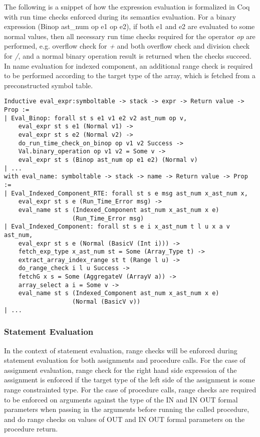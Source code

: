 The following is a snippet of how the expression evaluation is formalized in Coq
with run time checks enforced during its semantics evaluation. For a binary
expression (Binop ast\_num op e1 op e2), if both e1 and e2 are evaluated to some
normal values, then all necessary run time checks required for the operator
\textit{op} are performed, e.g. overflow check for \textit{+} and both overflow
check and division check for \textit{/}, and a normal binary operation result is
returned when the checks succeed. In name evaluation for indexed component, an
additional range check is required to be performed according to the target type
of the array, which is fetched from a preconstructed symbol table.

\begin{lstlisting}[escapechar=\#, language=coq, basicstyle=\small]
Inductive eval_expr:symboltable -> stack -> expr -> Return value -> Prop :=
| Eval_Binop: forall st s e1 v1 e2 v2 ast_num op v,
    eval_expr st s e1 (Normal v1) ->
    eval_expr st s e2 (Normal v2) ->
    do_run_time_check_on_binop op v1 v2 Success ->
    Val.binary_operation op v1 v2 = Some v ->
    eval_expr st s (Binop ast_num op e1 e2) (Normal v)
| ...
with eval_name: symboltable -> stack -> name -> Return value -> Prop :=
| Eval_Indexed_Component_RTE: forall st s e msg ast_num x_ast_num x,
    eval_expr st s e (Run_Time_Error msg) ->
    eval_name st s (Indexed_Component ast_num x_ast_num x e) 
                   (Run_Time_Error msg)
| Eval_Indexed_Component: forall st s e i x_ast_num t l u x a v ast_num, 
    eval_expr st s e (Normal (BasicV (Int i))) ->
    fetch_exp_type x_ast_num st = Some (Array_Type t) ->
    extract_array_index_range st t (Range l u) ->
    do_range_check i l u Success ->
    fetchG x s = Some (AggregateV (ArrayV a)) ->
    array_select a i = Some v ->
    eval_name st s (Indexed_Component ast_num x_ast_num x e) 
                   (Normal (BasicV v))
| ...
\end{lstlisting}

\subsubsection{Statement Evaluation}
In the context of statement evaluation, range checks will be enforced during
statement evaluation for both assignments and procedure calls. For the case of
assignment evaluation, range check for the right hand side expression of the
assignment is enforced if the target type of the left side of the assignment is
some range constrainted type. For the case of procedure calls, range checks are
required to be enforced on arguments against the type of the IN and IN OUT
formal parameters when passing in the arguments before running the called
procedure, and do range checks on values of OUT and IN OUT formal parameters
on the procedure return.

